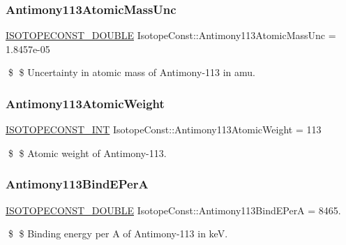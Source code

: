 \subsubsection{\texorpdfstring{Antimony113\+Atomic\+Mass\+Unc}{Antimony113AtomicMassUnc}}
{\footnotesize\ttfamily \mbox{\hyperlink{group___isotope_const-_macros_ga8f45a7272ce02c0b4c65c44636ed719a}{I\+S\+O\+T\+O\+P\+E\+C\+O\+N\+S\+T\+\_\+\+D\+O\+U\+B\+LE}} Isotope\+Const\+::\+Antimony113\+Atomic\+Mass\+Unc = 1.\+8457e-\/05}

\$ \$ Uncertainty in atomic mass of Antimony-\/113 in amu. \mbox{\label{group___isotope_const-_antimony-_sb113_ga784c948a69c595a84bb0cb719d909449}} 
\subsubsection{\texorpdfstring{Antimony113\+Atomic\+Weight}{Antimony113AtomicWeight}}
{\footnotesize\ttfamily \mbox{\hyperlink{group___isotope_const-_macros_ga5f18360b3e99483a35c32d789e62621c}{I\+S\+O\+T\+O\+P\+E\+C\+O\+N\+S\+T\+\_\+\+I\+NT}} Isotope\+Const\+::\+Antimony113\+Atomic\+Weight = 113}

\$ \$ Atomic weight of Antimony-\/113. \mbox{\label{group___isotope_const-_antimony-_sb113_gafb97496d7de21abda488f276088ff5a9}} 
\subsubsection{\texorpdfstring{Antimony113\+Bind\+E\+PerA}{Antimony113BindEPerA}}
{\footnotesize\ttfamily \mbox{\hyperlink{group___isotope_const-_macros_ga8f45a7272ce02c0b4c65c44636ed719a}{I\+S\+O\+T\+O\+P\+E\+C\+O\+N\+S\+T\+\_\+\+D\+O\+U\+B\+LE}} Isotope\+Const\+::\+Antimony113\+Bind\+E\+PerA = 8465.}

\$ \$ Binding energy per A of Antimony-\/113 in keV. \mbox{\label{group___isotope_const-_antimony-_sb113_gaeeb0f25ea894aef5d79586d40c458218}} 
